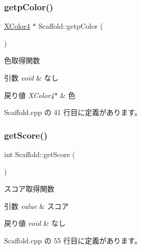 \subsubsection{\texorpdfstring{getp\+Color()}{getpColor()}}
{\footnotesize\ttfamily \mbox{\hyperlink{_vector3_d_8h_a680c30c4a07d86fe763c7e01169cd6cc}{X\+Color4}} $\ast$ Scaffold\+::getp\+Color (\begin{DoxyParamCaption}{ }\end{DoxyParamCaption})}



色取得関数 


\begin{DoxyParams}{引数}
{\em void} & なし \\
\hline
\end{DoxyParams}

\begin{DoxyRetVals}{戻り値}
{\em X\+Color4$\ast$} & 色 \\
\hline
\end{DoxyRetVals}


 Scaffold.\+cpp の 41 行目に定義があります。

\mbox{\label{class_scaffold_a57ebf7f07d9e8fc6bf941eb2c720f001}} 
\subsubsection{\texorpdfstring{get\+Score()}{getScore()}}
{\footnotesize\ttfamily int Scaffold\+::get\+Score (\begin{DoxyParamCaption}{ }\end{DoxyParamCaption})}



スコア取得関数 


\begin{DoxyParams}{引数}
{\em value} & スコア \\
\hline
\end{DoxyParams}

\begin{DoxyRetVals}{戻り値}
{\em void} & なし \\
\hline
\end{DoxyRetVals}


 Scaffold.\+cpp の 55 行目に定義があります。

\mbox{\label{class_scaffold_a7781f0c0fcde243975f1077540e0b981}} 
